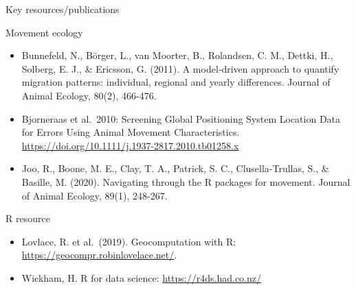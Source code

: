 \documentclass[ignorenonframetext,,t]{beamer}
\providecommand{\tightlist}{%
\setlength{\itemsep}{0pt}\setlength{\parskip}{0pt}}
\providecommand{\tightlist}{%
\setlength{\itemsep}{0pt}\setlength{\parskip}{0pt}}
\renewcommand{\tightlist}{\setlength{\itemsep}{1.4ex}\setlength{\parskip}{0pt}}
\begin{document}
\begin{frame}{Key resources/publications}
\protect\hypertarget{key-resourcespublications}{}
\footnotesize

\begin{block}{Movement ecology}
\protect\hypertarget{movement-ecology}{}
\begin{itemize}
\tightlist
\item
  Bunnefeld, N., Börger, L., van Moorter, B., Rolandsen, C. M., Dettki,
  H., Solberg, E. J., \& Ericsson, G. (2011). A model‐driven approach to
  quantify migration patterns: individual, regional and yearly
  differences. Journal of Animal Ecology, 80(2), 466-476.
\item
  Bjorneraas et al.~2010: Screening Global Positioning System Location
  Data for Errors Using Animal Movement Characteristics.
  \url{https://doi.org/10.1111/j.1937-2817.2010.tb01258.x}
\item
  Joo, R., Boone, M. E., Clay, T. A., Patrick, S. C., Clusella‐Trullas,
  S., \& Basille, M. (2020). Navigating through the R packages for
  movement. Journal of Animal Ecology, 89(1), 248-267.
\end{itemize}
\end{block}

\begin{block}{R resource}
\protect\hypertarget{r-resource}{}
\begin{itemize}
\tightlist
\item
  Lovlace, R. et al.~(2019). Geocomputation with R:
  \url{https://geocompr.robinlovelace.net/}.
\item
  Wickham, H. R for data science: \url{https://r4ds.had.co.nz/}
\end{itemize}
\end{block}
\end{frame}
\end{document}
